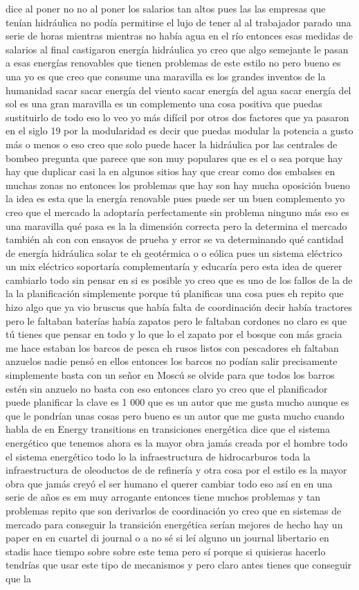 dice al poner no no al poner los salarios tan altos pues las las empresas que tenían hidráulica no podía permitirse el lujo de tener al al trabajador parado una serie de horas mientras mientras no había agua en el río entonces esas medidas de salarios al final castigaron energía hidráulica yo creo que algo semejante le pasan a esas energías renovables que tienen problemas de este estilo no pero bueno es una yo es que creo que consume una maravilla es los grandes inventos de la humanidad sacar sacar energía del viento sacar energía del agua sacar energía del sol es una gran maravilla es un complemento una cosa positiva que puedas sustituirlo de todo eso lo veo yo más difícil por otros dos factores que ya pasaron en el siglo 19 por la modularidad es decir que puedas modular la potencia a gusto más o menos o eso creo que solo puede hacer la hidráulica por las centrales de bombeo pregunta que parece que son muy populares que es el o sea porque hay hay que duplicar casi la en algunos sitios hay que crear como dos embalses en muchas zonas no entonces los problemas que hay son hay mucha oposición bueno la idea es esta que la energía renovable pues puede ser un buen complemento yo creo que el mercado la adoptaría perfectamente sin problema ninguno más eso es una maravilla qué pasa es la la dimensión correcta pero la determina el mercado también ah con con ensayos de prueba y error se va determinando qué cantidad de energía hidráulica solar te eh geotérmica o o eólica pues un sistema eléctrico un mix eléctrico soportaría complementaría y educaría pero esta idea de querer cambiarlo todo sin pensar en si es posible yo creo que es uno de los fallos de la de la la planificación simplemente porque tú planificas una cosa pues eh repito que hizo algo que ya vio bruscus que había falta de coordinación decir había tractores pero le faltaban baterías había zapatos pero le faltaban cordones no claro es que tú tienes que pensar en todo y lo que lo el zapato por el bosque con más gracia me hace estaban los barcos de pesca eh rusos listos con pescadores eh faltaban anzuelos nadie pensó en ellos entonces los barcos no podían salir precisamente simplemente basta con un señor en Moscú se olvide para que todos los barros estén sin anzuelo no basta con eso entonces claro yo creo que el planificador puede planificar la clave es 1 000 que es un autor que me gusta mucho aunque es que le pondrían unas cosas pero bueno es un autor que me gusta mucho cuando habla de en Energy transitions en transiciones energética dice que el sistema energético que tenemos ahora es la mayor obra jamás creada por el hombre todo el sistema energético todo lo la infraestructura de hidrocarburos toda la infraestructura de oleoductos de de refinería y otra cosa por el estilo es la mayor obra que jamás creyó el ser humano el querer cambiar todo eso así en en una serie de años es em muy arrogante entonces tiene muchos problemas y tan problemas repito que son derivarlos de coordinación yo creo que en sistemas de mercado para conseguir la transición energética serían mejores de hecho hay un paper en en cuartel di journal o a no sé si leí alguno un journal libertario en stadis hace tiempo sobre sobre este tema pero sí porque si quisieras hacerlo tendrías que usar este tipo de mecanismos y pero claro antes tienes que conseguir que la 